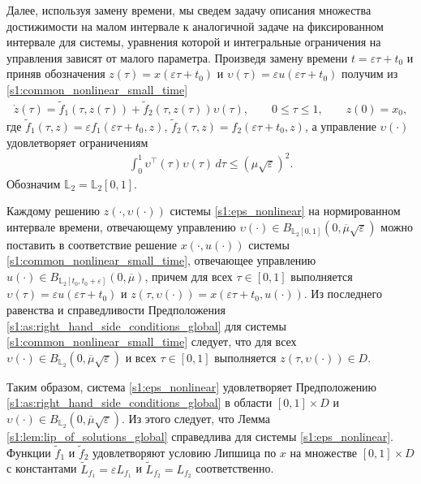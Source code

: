 \documentclass[../main.tex]{subfiles}
\begin{document}
    
Далее, используя замену времени, мы сведем задачу описания множества достижимости на малом интервале к аналогичной задаче на фиксированном интервале для системы, уравнения которой и интегральные ограничения на управления зависят от малого параметра.
Произведя замену времени $ t = \varepsilon \tau + t_0 $ и приняв обозначения $ z(\tau) = x(\varepsilon \tau + t_0) $ и $ \upsilon(\tau) = \varepsilon u(\varepsilon \tau + t_0) $  получим из \eqref{s1:common_nonlinear_small_time}
\begin{gather}\label{s1:eps_nonlinear}
    \dot{z}(\tau)=\widetilde{f}_1(\tau,z(\tau))+\widetilde{f}_2(\tau,z(\tau))\upsilon(\tau), \qquad 0 \leqslant \tau \leqslant 1, \qquad z(0) = x_0,
\end{gather}
где $ \widetilde{f}_1(\tau,z) = \varepsilon f_1(\varepsilon \tau + t_0,z) $, $ \widetilde{f}_2 (\tau,z) = f_2(\varepsilon \tau + t_0,z)$, а управление $ \upsilon(\cdot) $ удовлетворяет ограничениям
\begin{gather}\label{s1:eps_control_constaint}
    \int_0^1 \upsilon^{\top}(\tau) \upsilon(\tau) \, d\tau \leqslant \left( \mu \sqrt{\varepsilon}\right)^2.
\end{gather}
Обозначим $\mathbb{L}_2 = \mathbb{L}_2[0, 1]$. 

Каждому решению $z(\cdot, \upsilon(\cdot))$ системы \eqref{s1:eps_nonlinear} на нормированном интервале времени, отвечающему управлению $\upsilon(\cdot) \in B_{\mathbb{L}_2[0, 1]} (0, \overline{\mu} \sqrt{\varepsilon})$ можно поставить в соответствие решение $x(\cdot, u(\cdot))$ системы \eqref{s1:common_nonlinear_small_time}, отвечающее управлению $u(\cdot) \in B_{\mathbb{L}_2[t_0, t_0 + \varepsilon]} (0, \overline{\mu})$, причем для всех $\tau \in [0, 1] $ выполняется $ \upsilon(\tau) = \varepsilon u(\varepsilon \tau + t_0)$ и $ z(\tau, \upsilon(\cdot)) = x(\varepsilon \tau + t_0, u(\cdot)) $.
Из последнего равенства и справедливости Предположения \ref{s1:as:right_hand_side_conditions_global} для системы \eqref{s1:common_nonlinear_small_time} следует, что для всех  $\upsilon(\cdot) \in B_{\mathbb{L}_2}(0, \overline{\mu}\sqrt{\varepsilon})$ и всех $\tau \in [0, 1] $ выполняется $z(\tau, \upsilon(\cdot)) \in D$. 

Таким образом, система \eqref{s1:eps_nonlinear}  удовлетворяет Предположению  \ref{s1:as:right_hand_side_conditions_global} в области $[0, 1]\times D$ и $\upsilon(\cdot) \in B_{\mathbb{L}_2}(0, \overline{\mu}\sqrt{\varepsilon}) $.
Из этого следует, что Лемма \ref{s1:lem:lip_of_solutions_global} справедлива для системы  \eqref{s1:eps_nonlinear}.
Функции  $\widetilde{f}_1$ и $\widetilde{f}_2$ удовлетворяют условию Липшица по $x$ на множестве $[0, 1]\times D$ с константами $\widetilde{L}_{f_1} = \varepsilon L_{f_1} $ и  $\widetilde{L}_{f_2} = L_{f_2} $ соответственно. 
\end{document}
